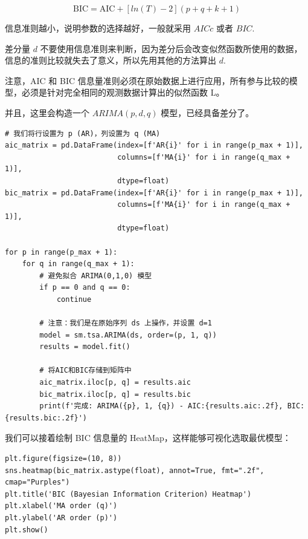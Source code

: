 \begin{definition}
    $$
        \mathrm{BIC}=\mathrm{AIC}+[ln(T)-2](p+q+k+1)
    $$
\end{definition}

\begin{theorem}
    信息准则越小，说明参数的选择越好，一般就采用 $AICc$ 或者 $BIC$.
\end{theorem}

\begin{warning}
    差分量 $d$ 不要使用信息准则来判断，因为差分后会改变似然函数所使用的数据，信息的准则比较就失去了意义，所以先用其他的方法算出 $d$.
\end{warning}

\begin{warning}
    注意，AIC 和 BIC 信息量准则必须在原始数据上进行应用，所有参与比较的模型，必须是针对完全相同的观测数据计算出的似然函数 L。

    并且，这里会构造一个 $ARIMA(p,d,q)$ 模型，已经具备差分了。
\end{warning}

\begin{lstlisting}[style=python]
# 我们将行设置为 p (AR)，列设置为 q (MA)
aic_matrix = pd.DataFrame(index=[f'AR{i}' for i in range(p_max + 1)],
                          columns=[f'MA{i}' for i in range(q_max + 1)],
                          dtype=float)
bic_matrix = pd.DataFrame(index=[f'AR{i}' for i in range(p_max + 1)],
                          columns=[f'MA{i}' for i in range(q_max + 1)],
                          dtype=float)

for p in range(p_max + 1):
    for q in range(q_max + 1):
        # 避免拟合 ARIMA(0,1,0) 模型
        if p == 0 and q == 0:
            continue

        # 注意：我们是在原始序列 ds 上操作，并设置 d=1
        model = sm.tsa.ARIMA(ds, order=(p, 1, q))
        results = model.fit()

        # 将AIC和BIC存储到矩阵中
        aic_matrix.iloc[p, q] = results.aic
        bic_matrix.iloc[p, q] = results.bic
        print(f'完成: ARIMA({p}, 1, {q}) - AIC:{results.aic:.2f}, BIC:{results.bic:.2f}')
\end{lstlisting}

我们可以接着绘制 BIC 信息量的 HeatMap，这样能够可视化选取最优模型：

\begin{lstlisting}[style=python]
plt.figure(figsize=(10, 8))
sns.heatmap(bic_matrix.astype(float), annot=True, fmt=".2f", cmap="Purples")
plt.title('BIC (Bayesian Information Criterion) Heatmap')
plt.xlabel('MA order (q)')
plt.ylabel('AR order (p)')
plt.show()
\end{lstlisting}

